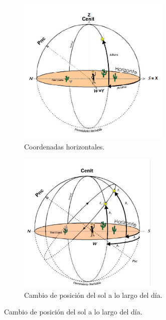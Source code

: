 \begin{figure}[h]
	\centering
	\begin{subfigure}{0.45\textwidth}
		\centering
		\includegraphics[width=0.8\textwidth]{Cuerpo/Imagenes/01_Horizontales.png}
		\caption{Coordenadas horizontales.}
	\end{subfigure}
	\hfill
	\begin{subfigure}{0.45\textwidth}
		\centering
		\includegraphics[width=0.75\textwidth]{Cuerpo/Imagenes/01_Horizontales_2.png}
		\caption{Cambio de posición del sol a lo largo del día.}
	\end{subfigure}
\end{figure}

